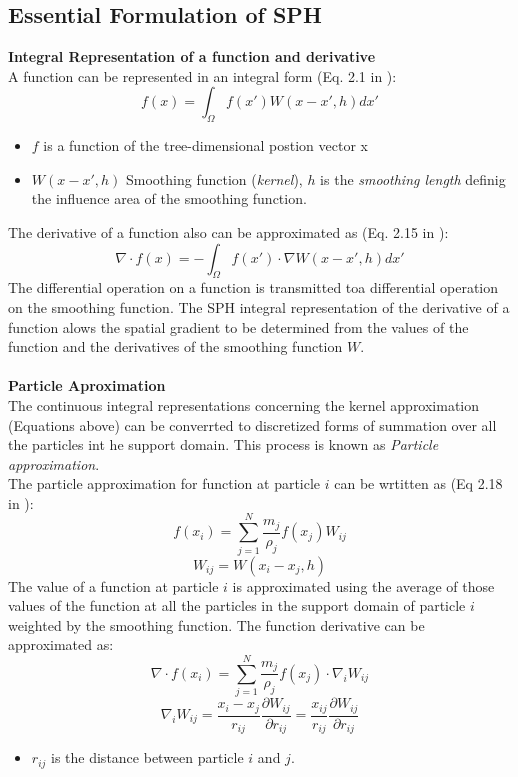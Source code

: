 \documentclass[12pt]{thesis}
\begin{document}
\subsection{Essential Formulation of SPH}
\textbf{Integral Representation of a function and derivative}\\
A function can be represented in an integral form (Eq. 2.1 in \cite{Liu_SPH}):
\[f(x)=\int_{\Omega}{f(x\prime)W(x-x',h)dx'}\]
\begin{itemize}
\item $f$ is a function of the tree-dimensional postion vector x
\item $W(x-x',h)$ Smoothing function (\textit{kernel}), $h$ is the \textit{smoothing length} definig the influence area of the smoothing function.
\end{itemize}
The derivative of a function also can be approximated as (Eq. 2.15 in \cite{Liu_SPH}):
\[\nabla\cdot f(x)=-\int_{\Omega}{f(x')\cdot\nabla W(x-x',h)dx'}\]
The differential operation on a function is transmitted toa  differential operation on the smoothing function. The SPH integral representation of the derivative of a function alows the spatial gradient to be determined from the values of the function and the derivatives of the smoothing function $W$.\\\\
\textbf{Particle Aproximation}\\
The continuous integral representations concerning the kernel approximation (Equations above) can be converrted to discretized forms of summation over all the particles int he support domain. This process is known as \textit{Particle approximation}.\\
The particle approximation for  function at particle $i$ can be wrtitten as (Eq 2.18 in \cite{Liu_SPH}):
\[f(x_i)=\sum_{j=1}^{N}{\frac{m_j}{\rho_j}f(x_j)W_{ij}}\]
\[W_{ij}=W(x_i-x_j,h)\]
The value of a function at particle $i$ is approximated using the average of those values of the function at all the particles in the support domain of particle $i$ weighted by the smoothing function.
The function derivative can be approximated as:
\[ \nabla\cdot f(x_i)=\sum_{j=1}^{N}{\frac{m_j}{\rho_j}f(x_j)\cdot\nabla_i W_{ij}}\]
\[\nabla_iW_{ij}=\frac{x_i-x_j}{r_{ij}}\frac{\partial W_{ij} }{\partial r_{ij}}=\frac{x_{ij}}{r_{ij}}\frac{\partial W_{ij}}{\partial r_{ij}}\]
\begin{itemize}
\item $r_{ij}$ is the distance between particle $i$ and $j$.
\end{itemize}
\end{document}
